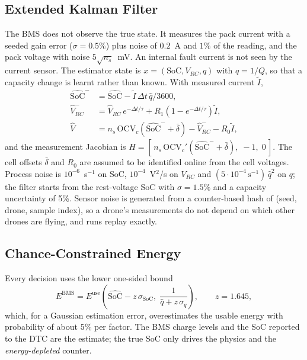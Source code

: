 \documentclass[journal]{IEEEtran}
\newcommand{\socH}{\widehat{\mathrm{SoC}}}
\newcommand{\Ebms}{E^{\mathrm{BMS}}}
\begin{document}
\subsection{Extended Kalman Filter}
The BMS does not observe the true state. It measures the pack current with a seeded gain error ($\sigma = 0.5\%$) plus noise of $0.2$~A and $1\%$ of the reading, and the pack voltage with noise $5\sqrt{n_s}$~mV. An internal fault current is not seen by the current sensor. The estimator state is $x = (\mathrm{SoC}, V_{RC}, q)$ with $q = 1/Q$, so that a capacity change is learnt rather than known. With measured current $\tilde I$,
\begin{align}
\socH^{-} &= \socH - \tilde I\,\Delta t\, \hat q / 3600, \\
\hat V_{RC}^{-} &= \hat V_{RC}\, e^{-\Delta t/\tau} + R_1 (1 - e^{-\Delta t/\tau}) \tilde I,\\
\hat V &= n_s\, \mathrm{OCV}_c(\socH^{-} + \bar\delta) - \hat V_{RC}^{-} - R_0 \tilde I,
\end{align}
and the measurement Jacobian is $H = [\,n_s\, \mathrm{OCV}_c'(\socH^{-} + \bar\delta),\; -1,\; 0\,]$. The cell offsets $\bar\delta$ and $R_0$ are assumed to be identified online from the cell voltages. Process noise is $10^{-6}$~s$^{-1}$ on SoC, $10^{-4}$~V$^2$/s on $V_{RC}$ and $(5\cdot 10^{-4}\,\mathrm{s}^{-1})\,\hat q^2$ on $q$; the filter starts from the rest-voltage SoC with $\sigma = 1.5\%$ and a capacity uncertainty of 5\%. Sensor noise is generated from a counter-based hash of (seed, drone, sample index), so a drone's measurements do not depend on which other drones are flying, and runs replay exactly.

\subsection{Chance-Constrained Energy}
Every decision uses the lower one-sided bound
\begin{equation}
\Ebms = E^{\mathrm{use}}\!\left(\socH - z\,\sigma_{\mathrm{SoC}},\; \frac{1}{\hat q + z\,\sigma_q}\right), \qquad z = 1.645,
\label{eq:ebms}
\end{equation}
which, for a Gaussian estimation error, overestimates the usable energy with probability of about 5\% per factor. The BMS charge levels and the SoC reported to the DTC are the estimate; the true SoC only drives the physics and the \textit{energy-depleted} counter.
\end{document}
